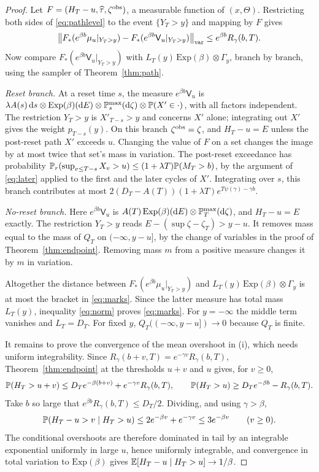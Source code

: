 \documentclass[11pt,a4paper]{article}
\begin{document}
\begin{proof}
Let $F=(H_T-u,\widehat\tau,\zeta^{\rm obs})$, a measurable function of $(x,\Theta)$. Restricting both sides of \eqref{eq:pathlevel} to the event $\{Y_T>y\}$ and mapping by $F$ gives
\[
 \big\|F_*(e^{\beta b}\mu_u|_{Y_T>y})-F_*(e^{\beta b}\mathsf V_u|_{Y_T>y})\big\|_{\mathrm{var}}\le e^{\beta b}R_\gamma(b,T).
\]
Now compare $F_*(e^{\beta b}\mathsf V_u|_{Y_T>y})$ with $L_T(y)\,\mathrm{Exp}(\beta)\otimes\Gamma_y$, branch by branch, using the sampler of Theorem~\ref{thm:path}.

\emph{Reset branch.} At a reset time $s$, the measure $e^{\beta b}\mathsf V_u$ is $\lambda A(s)\,\mathrm d s\otimes\mathrm{Exp}(\beta)(\mathrm dE)\otimes\mathbb P^{\max}_s(\mathrm d\zeta)\otimes\mathbb P(X'\in\cdot)$, with all factors independent. The restriction $Y_T>y$ is $X'_{T-s}>y$ and concerns $X'$ alone; integrating out $X'$ gives the weight $p_{T-s}(y)$. On this branch $\zeta^{\rm obs}=\zeta$, and $H_T-u=E$ unless the post-reset path $X'$ exceeds $u$. Changing the value of $F$ on a set changes the image by at most twice that set's mass in variation. The post-reset exceedance has probability $\mathbb P_r(\sup_{v\le T-s}X_v>u)\le(1+\lambda T)\mathbb P(M_T>b)$, by the argument of \eqref{eq:later} applied to the first and the later cycles of $X'$. Integrating over $s$, this branch contributes at most $2(D_T-A(T))(1+\lambda T)e^{T\psi(\gamma)-\gamma b}$.

\emph{No-reset branch.} Here $e^{\beta b}\mathsf V_u$ is $A(T)\,\mathrm{Exp}(\beta)(\mathrm dE)\otimes\mathbb P^{\max}_T(\mathrm d\zeta)$, and $H_T-u=E$ exactly. The restriction $Y_T>y$ reads $E-(\sup\zeta-\zeta_T)>y-u$. It removes mass equal to the mass of $Q_T$ on $(-\infty,y-u]$, by the change of variables in the proof of Theorem~\ref{thm:endpoint}. Removing mass $m$ from a positive measure changes it by $m$ in variation.

Altogether the distance between $F_*(e^{\beta b}\mu_u|_{Y_T>y})$ and $L_T(y)\,\mathrm{Exp}(\beta)\otimes\Gamma_y$ is at most the bracket in \eqref{eq:marks}. Since the latter measure has total mass $L_T(y)$, inequality \eqref{eq:norm} proves \eqref{eq:marks}. For $y=-\infty$ the middle term vanishes and $L_T=D_T$. For fixed $y$, $Q_T((-\infty,y-u])\to0$ because $Q_T$ is finite.

It remains to prove the convergence of the mean overshoot in (i), which needs uniform integrability. Since $R_\gamma(b+v,T)=e^{-\gamma v}R_\gamma(b,T)$, Theorem~\ref{thm:endpoint} at the thresholds $u+v$ and $u$ gives, for $v\ge0$,
\[
 \mathbb P(H_T>u+v)\le D_Te^{-\beta(b+v)}+e^{-\gamma v}R_\gamma(b,T),\qquad \mathbb P(H_T>u)\ge D_Te^{-\beta b}-R_\gamma(b,T).
\]
Take $b$ so large that $e^{\beta b}R_\gamma(b,T)\le D_T/2$. Dividing, and using $\gamma>\beta$,
\[
 \mathbb P(H_T-u>v\mid H_T>u)\le2e^{-\beta v}+e^{-\gamma v}\le3e^{-\beta v}\qquad(v\ge0).
\]
The conditional overshoots are therefore dominated in tail by an integrable exponential uniformly in large $u$, hence uniformly integrable, and convergence in total variation to $\mathrm{Exp}(\beta)$ gives $\mathbb E[H_T-u\mid H_T>u]\to1/\beta$.
\end{proof}
\end{document}
